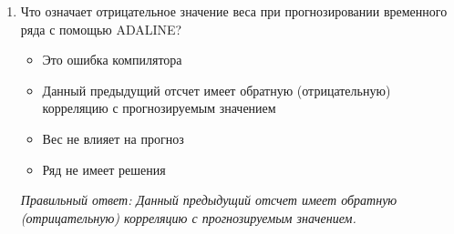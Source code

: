 \begin{enumerate}[label=\textbf{\arabic*.}, leftmargin=0pt, itemsep=1.2em]
\item Что означает отрицательное значение веса при прогнозировании временного ряда с помощью ADALINE?
\begin{itemize}[label=$\square$, leftmargin=1.5cm, itemsep=0.2em, topsep=0.3em]
\item Это ошибка компилятора
\item Данный предыдущий отсчет имеет обратную (отрицательную) корреляцию с прогнозируемым значением
\item Вес не влияет на прогноз
\item Ряд не имеет решения
\end{itemize}
{\small\textit{Правильный ответ: Данный предыдущий отсчет имеет обратную (отрицательную) корреляцию с прогнозируемым значением.}}

\end{enumerate}
